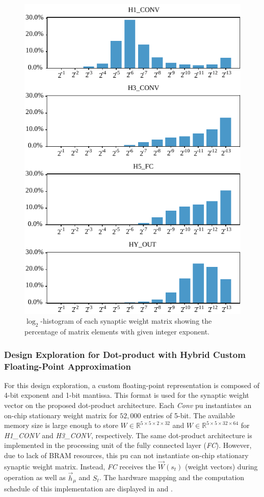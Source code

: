 \begin{figure}[b!]
	\centering
	\includegraphics[width=0.5\columnwidth]{./chapters/sbs_accelerator/figures/log2_histogram.pdf}
	\caption{$\log_2$-histogram of each synaptic weight matrix showing the percentage of matrix elements with given integer exponent.}\label{fig:log2histogram}
\end{figure}

\subsubsection{Design Exploration for Dot-product with Hybrid Custom Floating-Point Approximation}
For this design exploration, a custom floating-point representation is composed of 4-bit exponent and 1-bit mantissa. This format is used for the synaptic weight vector on the proposed dot-product architecture. Each \emph{Conv} \gls{pu} instantiates an on-chip stationary weight matrix for $52,000$ entries of 5-bit. The available memory size is large enough to store $W\in\mathbb{R}^{5\times 5\times 2\times 32}$ and $W\in\mathbb{R}^{5\times 5\times 32\times 64}$ for \emph{H1\_CONV} and \emph{H3\_CONV}, respectively. The same dot-product architecture is implemented in the processing unit of the fully connected layer (\emph{FC}). However, due to lack of BRAM resources, this \gls{pu} can not instantiate on-chip stationary synaptic weight matrix. Instead, \emph{FC} receives the $\vec{W}(s_t)$ (weight vectors) during operation as well as $\vec{h}_\mu$ and $S_t$. The hardware mapping and the computation schedule of this implementation are displayed in  and .

